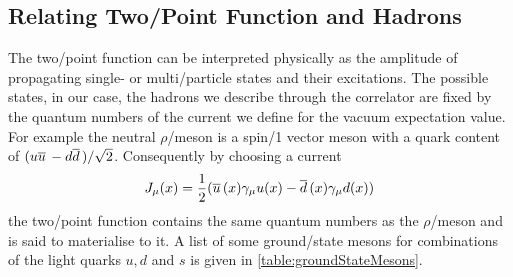\documentclass[../../index.tex]{subfiles}
\begin{document}
\subsection{Relating Two\-/Point Function and Hadrons}
The two\-/point function can be interpreted physically as the amplitude of
propagating single- or multi\-/particle states and their excitations. The
possible states, in our case, the hadrons we describe through the correlator are
fixed by the quantum numbers of the current we define for the vacuum expectation
value. For example the neutral $\rho$\-/meson is a spin\-/1 vector meson with a
quark content of \((u\overline{u}\, - d\overline{d}\,)/\sqrt{2}\). Consequently by choosing
a current
\begin{equation}
  J_\mu(x) = \frac{1}{2} ( \overline{u}\,(x)\gamma_\mu u(x) - \overline{d}\,(x)\gamma_\mu d(x) )
\end{equation}
the two\-/point function contains the same quantum numbers as the
\(\rho\)\-/meson and is said to materialise to it. A list of some ground\-/state
mesons for combinations of the light quarks \(u, d\) and \(s\) is given in
\cref{table:groundStateMesons}.
\end{document}
